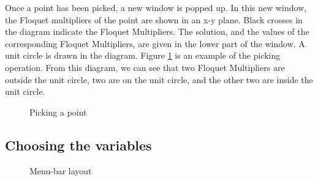 Once a point has been picked, a new window is popped up. In this new window, the Floquet
multipliers of the point are shown in an x-y plane.  
Black crosses in the diagram indicate the Floquet Multipliers.
The solution, and the values of the corresponding Floquet Multipliers, are given in the lower part of the
window. A unit circle is drawn in the diagram.
Figure \ref{fig:flq} is an example of the picking operation.
From this diagram, we can see that two Floquet Multipliers
are outside the unit circle, two are on the unit circle, and the other two are inside the unit circle.

\begin{figure}[!htmb]
\centering
{}
\caption{Picking a point }
\label{fig:flq}
\end{figure}

\subsection{Choosing the variables}

\begin{figure}[!htmb]
\centering
{}
\caption{Menu-bar layout}
\label{fig:mnbar}
\end{figure}

